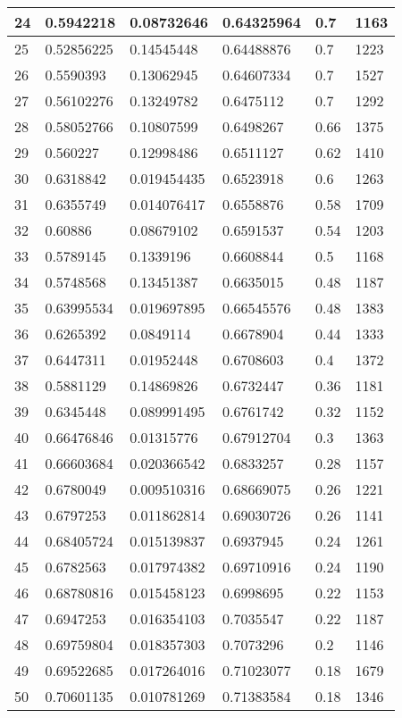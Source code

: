 \begin{longtable}{|l|l|l|l|l|l|}
24 & 0.5942218 & 0.08732646 & 0.64325964 & 0.7 & 1163 \\ \hline 
25 & 0.52856225 & 0.14545448 & 0.64488876 & 0.7 & 1223 \\ \hline 
26 & 0.5590393 & 0.13062945 & 0.64607334 & 0.7 & 1527 \\ \hline 
27 & 0.56102276 & 0.13249782 & 0.6475112 & 0.7 & 1292 \\ \hline 
28 & 0.58052766 & 0.10807599 & 0.6498267 & 0.66 & 1375 \\ \hline 
29 & 0.560227 & 0.12998486 & 0.6511127 & 0.62 & 1410 \\ \hline 
30 & 0.6318842 & 0.019454435 & 0.6523918 & 0.6 & 1263 \\ \hline 
31 & 0.6355749 & 0.014076417 & 0.6558876 & 0.58 & 1709 \\ \hline 
32 & 0.60886 & 0.08679102 & 0.6591537 & 0.54 & 1203 \\ \hline 
33 & 0.5789145 & 0.1339196 & 0.6608844 & 0.5 & 1168 \\ \hline 
34 & 0.5748568 & 0.13451387 & 0.6635015 & 0.48 & 1187 \\ \hline 
35 & 0.63995534 & 0.019697895 & 0.66545576 & 0.48 & 1383 \\ \hline 
36 & 0.6265392 & 0.0849114 & 0.6678904 & 0.44 & 1333 \\ \hline 
37 & 0.6447311 & 0.01952448 & 0.6708603 & 0.4 & 1372 \\ \hline 
38 & 0.5881129 & 0.14869826 & 0.6732447 & 0.36 & 1181 \\ \hline 
39 & 0.6345448 & 0.089991495 & 0.6761742 & 0.32 & 1152 \\ \hline 
40 & 0.66476846 & 0.01315776 & 0.67912704 & 0.3 & 1363 \\ \hline 
41 & 0.66603684 & 0.020366542 & 0.6833257 & 0.28 & 1157 \\ \hline 
42 & 0.6780049 & 0.009510316 & 0.68669075 & 0.26 & 1221 \\ \hline 
43 & 0.6797253 & 0.011862814 & 0.69030726 & 0.26 & 1141 \\ \hline 
44 & 0.68405724 & 0.015139837 & 0.6937945 & 0.24 & 1261 \\ \hline 
45 & 0.6782563 & 0.017974382 & 0.69710916 & 0.24 & 1190 \\ \hline 
46 & 0.68780816 & 0.015458123 & 0.6998695 & 0.22 & 1153 \\ \hline 
47 & 0.6947253 & 0.016354103 & 0.7035547 & 0.22 & 1187 \\ \hline 
48 & 0.69759804 & 0.018357303 & 0.7073296 & 0.2 & 1146 \\ \hline 
49 & 0.69522685 & 0.017264016 & 0.71023077 & 0.18 & 1679 \\ \hline 
50 & 0.70601135 & 0.010781269 & 0.71383584 & 0.18 & 1346 \\ \hline 
\end{longtable}